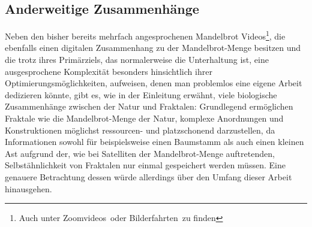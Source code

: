 \subsection{Anderweitige Zusammenhänge}\label{subsec:other-connections}

Neben den bisher bereits mehrfach angesprochenen
\glqq Mandelbrot Videos\grqq\footnote{
  Auch unter \glqq Zoomvideos\grqq~oder \glqq Bilderfahrten\grqq~zu finden
}, die ebenfalls einen digitalen Zusammenhang zu der Mandelbrot-Menge besitzen
und die trotz ihres Primärziels, das normalerweise die Unterhaltung ist, eine
ausgesprochene Komplexität besonders hinsichtlich ihrer Optimierungsmöglichkeiten,
aufweisen, denen man problemlos eine eigene Arbeit dedizieren könnte,
gibt es, wie in der Einleitung erwähnt,
viele biologische Zusammenhänge zwischen der Natur und Fraktalen:
Grundlegend ermöglichen Fraktale wie die Mandelbrot-Menge der Natur,
komplexe Anordnungen und Konstruktionen möglichst ressourcen- und platzschonend
darzustellen, da Informationen sowohl für beispielsweise einen Baumstamm als auch
einen kleinen Ast aufgrund der, wie bei Satelliten der Mandelbrot-Menge auftretenden,
Selbstähnlichkeit von Fraktalen nur einmal gespeichert werden müssen.
Eine genauere Betrachtung dessen würde allerdings über den Umfang
dieser Arbeit hinausgehen.